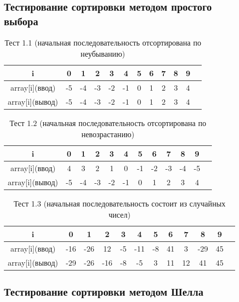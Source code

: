 \documentclass[a4paper,12pt,titlepage,finall]{article}
\begin{document}
\subsection{Тестирование сортировки методом простого выбора}
\begin{table}[h]
\centering
\begin{tabular}{|c|c|c|c|c|c|c|c|c|c|c|c|}
    \hline
    i & 0 & 1 & 2 & 3 & 4 & 5 & 6 & 7 & 8 & 9\\
    \hline
     array[i](ввод) & -5 & -4 & -3 & -2 & -1 & 0 & 1 & 2 & 3 & 4 \\
    \hline
     array[i](вывод) & -5 & -4 & -3 & -2 & -1 & 0 & 1 & 2 & 3 & 4 \\
    \hline
\end{tabular}
\caption{Тест 1.1 (начальная последовательность отсортирована по неубыванию)}
\end{table}

\begin{table}[h]
\centering
\begin{tabular}{|c|c|c|c|c|c|c|c|c|c|c|c|}
    \hline
    i & 0 & 1 & 2 & 3 & 4 & 5 & 6 & 7 & 8 & 9\\
    \hline
     array[i](ввод) & 4 & 3 & 2 & 1 & 0 & -1 & -2 & -3 & -4 & -5 \\
    \hline
     array[i](вывод) & -5 & -4 & -3 & -2 & -1 & 0 & 1 & 2 & 3 & 4 \\
    \hline
\end{tabular}
\caption{Тест 1.2 (начальная последовательность отсортирована по невозрастанию)}
\end{table}

\begin{table}[h]
\centering
\begin{tabular}{|c|c|c|c|c|c|c|c|c|c|c|c|}
    \hline
    i & 0 & 1 & 2 & 3 & 4 & 5 & 6 & 7 & 8 & 9\\
    \hline
     array[i](ввод) & -16 & -26 & 12 & -5 & -11 & -8 & 41 & 3 & -29 & 45 \\
    \hline
     array[i](вывод) & -29 & -26 & -16 & -8 & -5 & 3 & 11 & 12 & 41 & 45 \\
    \hline
\end{tabular}
\caption{Тест 1.3 (начальная последовательность состоит из случайных чисел)}
\end{table}

\clearpage


\subsection{Тестирование сортировки методом Шелла}
\end{document}
